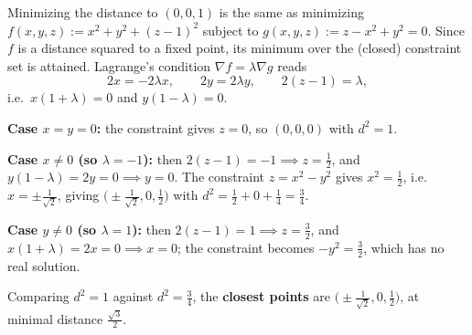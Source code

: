 \begin{exercisesolution}
\label{sol:closest_point_hyperbolic_paraboloid}
Minimizing the distance to $(0,0,1)$ is the same as minimizing
$f(x,y,z) := x^2+y^2+(z-1)^2$ subject to $g(x,y,z) := z-x^2+y^2 = 0$. Since $f$ is a distance
squared to a fixed point, its minimum over the (closed) constraint set is attained. Lagrange's
condition $\nabla f = \lambda \nabla g$ reads
\[2x = -2\lambda x, \qquad 2y = 2\lambda y, \qquad 2(z-1) = \lambda,\]
i.e.\ $x(1+\lambda) = 0$ and $y(1-\lambda) = 0$.

\textbf{Case $x=y=0$:} the constraint gives $z=0$, so $(0,0,0)$ with $d^2 = 1$.

\textbf{Case $x \neq 0$ (so $\lambda=-1$):} then $2(z-1)=-1 \implies z = \tfrac12$, and $y(1-\lambda)=2y=0
\implies y=0$. The constraint $z=x^2-y^2$ gives $x^2=\tfrac12$, i.e.\ $x=\pm\tfrac{1}{\sqrt2}$,
giving $\big(\pm\tfrac{1}{\sqrt2},0,\tfrac12\big)$ with $d^2 = \tfrac12+0+\tfrac14 = \tfrac34$.

\textbf{Case $y \neq 0$ (so $\lambda=1$):} then $2(z-1)=1 \implies z=\tfrac32$, and $x(1+\lambda)=2x=0
\implies x=0$; the constraint becomes $-y^2 = \tfrac32$, which has no real solution.

Comparing $d^2=1$ against $d^2=\tfrac34$, the \textbf{closest points} are
$\big(\pm\tfrac{1}{\sqrt2},0,\tfrac12\big)$, at minimal distance $\tfrac{\sqrt3}{2}$.
\end{exercisesolution}

